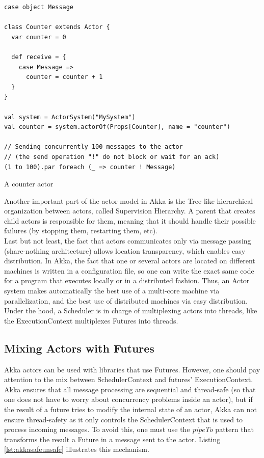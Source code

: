 \begin{listing}[h]
\begin{verbatim}
case object Message

class Counter extends Actor {
  var counter = 0

  def receive = {
    case Message => 
      counter = counter + 1
  }
}

val system = ActorSystem("MySystem")
val counter = system.actorOf(Props[Counter], name = "counter")

// Sending concurrently 100 messages to the actor 
// (the send operation "!" do not block or wait for an ack)
(1 to 100).par foreach (_ => counter ! Message)
\end{verbatim}
\caption{A counter actor}
\label{lst:actorexample}
\end{listing}

Another important part of the actor model in Akka is the Tree-like hierarchical organization between actors, called Supervision Hierarchy.
A parent that creates child actors is responsible for them, meaning that it should handle their possible failures (by stopping them,
restarting them, etc).
\\

Last but not least, the fact that actors communicates only via message passing (share-nothing architecture) allows location transparency, which
enables easy distribution. In Akka, the fact that one or several actors are located on different machines is written in a configuration file, so one can write the exact same code for a program that executes locally or in a distributed fashion. Thus, an Actor system makes automatically the best use of a multi-core machine via parallelization, and the best use of distributed machines via easy distribution.
Under the hood, a Scheduler is in charge of multiplexing actors into threads, like the ExecutionContext multiplexes Futures into threads.

\subsection{Mixing Actors with Futures}
\label{sec:mixingactorfuture}

Akka actors can be used with libraries that use Futures. However, one should pay attention to the mix between SchedulerContext 
and futures' ExecutionContext. Akka ensures that all message processing are sequential and thread-safe (so that one does not have to worry about concurrency problems inside an actor), but if the result of a future tries to modify the internal state of an actor, Akka can not ensure thread-safety as it only controls the SchedulerContext that is used to process incoming messages. To avoid this, one must use the \textit{pipeTo} pattern that transforms the result a Future in a message sent to the actor.
Listing \ref{lst:akkasafeunsafe} illustrates this mechanism.

